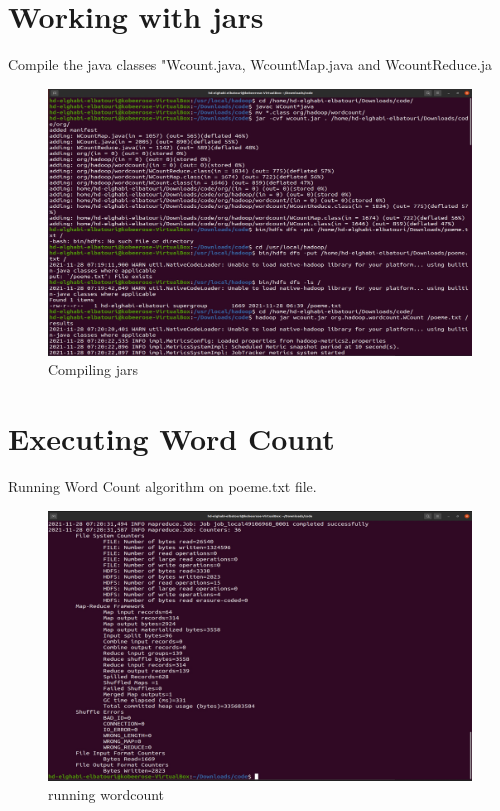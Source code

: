 \begin{spacing}{1.2}
\section{Working with jars}

\par Compile the java classes "Wcount.java, WcountMap.java and WcountReduce.ja
\\
\begin{figure}[!htb] 
\begin{center} 
\includegraphics[width=1\linewidth]{Big_Data/Hadoop/1-Node Map_Reduce/Compiling jars} 
\end{center} 
\caption{Compiling jars} 
\end{figure} 
\FloatBarrier

\section{Executing Word Count}

\par Running Word Count algorithm on poeme.txt file.
\\
\begin{figure}[!htb] 
\begin{center} 
\includegraphics[width=1\linewidth]{Big_Data/Hadoop/1-Node Map_Reduce/running wordcount} 
\end{center} 
\caption{running wordcount} 
\end{figure} 
\FloatBarrier


\end{spacing}
